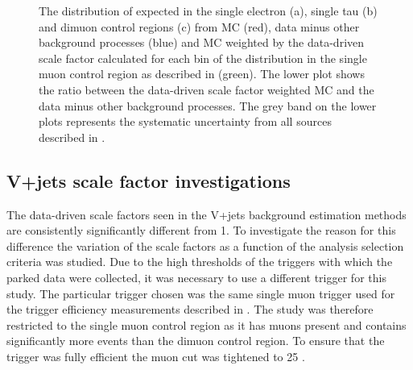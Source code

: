 \begin{figure}
  \caption{The distribution of \METnoMU expected in the single electron (a), single tau (b) and dimuon control regions (c) from MC (red), data minus other background processes (blue) and MC weighted by the data-driven scale factor calculated for each bin of the \METnoMU distribution in the single muon control region as described in  (green). The lower plot shows the ratio between the data-driven scale factor weighted MC and the data minus other background processes. The grey band on the lower plots represents the systematic uncertainty from all sources described in .}
  \label{fig:parkedclosure}
\end{figure}

\subsection{V+jets scale factor investigations}
\label{sec:parkedscalefactors}
The data-driven scale factors seen in the V+jets background estimation methods are consistently significantly different from 1. To investigate the reason for this difference the variation of the scale factors as a function of the analysis selection criteria was studied. Due to the high thresholds of the triggers with which the parked data were collected, it was necessary to use a different trigger for this study. The particular trigger chosen was the same single muon trigger used for the trigger efficiency measurements described in . The study was therefore restricted to the single muon control region as it has muons present and contains significantly more events than the dimuon control region. To ensure that the trigger was fully efficient the muon \pt cut was tightened to 25 \GeV.

